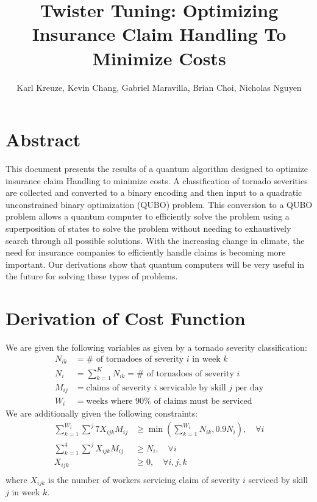 \documentclass[12pt]{article}
\title{Twister Tuning: Optimizing Insurance Claim Handling To Minimize Costs}
\author{Karl Kreuze, Kevin Chang, Gabriel Maravilla, Brian Choi, Nicholas Nguyen}
\begin{document}
\maketitle

\section*{Abstract}
This document presents the results of a quantum algorithm designed to optimize insurance claim Handling
to minimize costs. A classification of tornado severities are collected and converted to a binary
encoding and then input to a quadratic unconstrained binary optimization (QUBO) problem. 
This conversion to a QUBO problem allows a quantum computer to efficiently solve the problem using
a superposition of states to solve the problem without needing to exhaustively search through all possible
solutions. With the increasing change in climate, the need for insurance companies to
efficiently handle claims is becoming more important. Our derivations show that quantum computers
will be very useful in the future for solving these types of problems.

\section*{Derivation of Cost Function}
We are given the following variables as given by a tornado severity classification:
\begin{align*}
    N_{ik} &= \text{$\#$ of tornadoes of severity $i$ in week $k$}\\
    N_{i} &= \sum_{k=1}^{K} N_{ik} = \text{$\#$ of tornadoes of severity $i$}\\
    M_{ij} &= \text{claims of severity $i$ servicable by skill $j$ per day}\\
    W_{i} &= \text{weeks where 90$\%$ of claims must be serviced}
\end{align*}
\newpage 
\noindent
We are additionally given the following constraints:
\begin{align*}
    \sum_{k=1}^{W_i} \sum^{j} 7X_{ijk}M_{ij} &\geq \min(\sum_{k=1}^{W_i}N_{ik}, 0.9N_{i}), \quad \forall i\\
    \sum_{k=1}^{4}\sum^{j} X_{ijk}M_{ij} &\geq N_{i}, \quad \forall i\\
    X_{ijk} &\geq 0, \quad \forall i,j,k\\
\end{align*}
where $X_{ijk}$ is the number of workers servicing claim of severity $i$ serviced by skill $j$ in week $k$.
\end{document}
